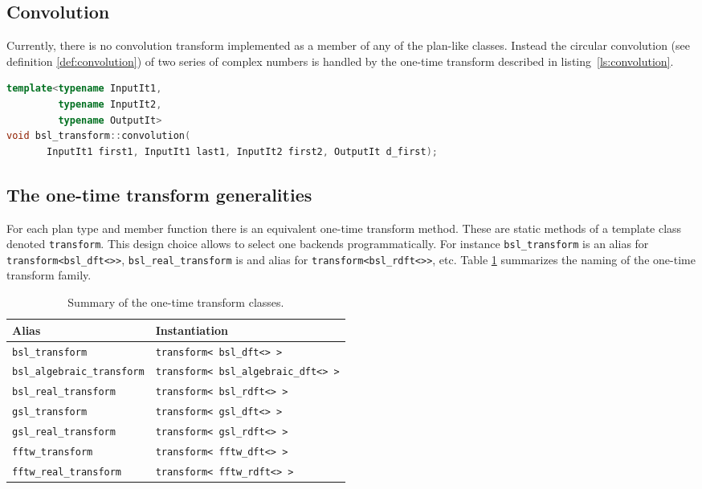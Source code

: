 \subsection{Convolution}
Currently, there is no convolution transform implemented as a member of any of
the plan-like classes. Instead the circular convolution (see definition
\ref{def:convolution}) of two series of complex
numbers is handled by the one-time transform described in listing~\ref{ls:convolution}.
    
\begin{lstlisting}[language=C++,caption=Convolution.,label=ls:convolution]
template<typename InputIt1,
         typename InputIt2,
         typename OutputIt>
void bsl_transform::convolution(
       InputIt1 first1, InputIt1 last1, InputIt2 first2, OutputIt d_first);
\end{lstlisting}

\subsection{The one-time transform generalities}
For each plan type and member function there is an equivalent one-time transform
method. These are static methods of a template class denoted \verb|transform|. 
This design choice allows to select one backends programmatically.
For instance \verb|bsl_transform| is an alias for \verb|transform<bsl_dft<>>|,
\verb|bsl_real_transform| is and alias for \verb|transform<bsl_rdft<>>|, etc.
Table \ref{tab:transform} summarizes the naming of the one-time transform family.
\begin{table}[h]
    \centering
    \begin{tabular}{ll}
        Alias & Instantiation \\
        \hline
        \verb|bsl_transform| & \verb|transform< bsl_dft<> >|\\
        \verb|bsl_algebraic_transform| & \verb|transform< bsl_algebraic_dft<> >|\\
        \verb|bsl_real_transform| & \verb|transform< bsl_rdft<> >|\\
        \verb|gsl_transform| & \verb|transform< gsl_dft<> >|\\
        \verb|gsl_real_transform| & \verb|transform< gsl_rdft<> >|\\
        \verb|fftw_transform| & \verb|transform< fftw_dft<> >|\\
        \verb|fftw_real_transform| & \verb|transform< fftw_rdft<> >|\\
    \end{tabular}
    \caption{Summary of the one-time transform classes.}
    \label{tab:transform}
\end{table}

